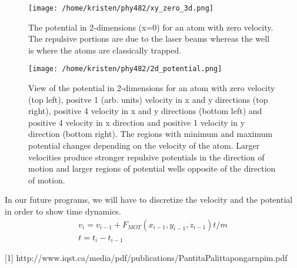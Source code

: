 \documentclass[10pt,showpacs,preprintnumbers,footinbib,amsmath,amssymb,aps,prl,groupedaddress,superscriptaddress,showkeys]{revtex4-1}
\begin{document}
\begin{figure}[ht!]\label{2dpot}
  \centering
  \texttt{[image: /home/kristen/phy482/xy\_zero\_3d.png]}
  \caption{The potential in 2-dimensions (x=0) for an atom with zero velocity. The repulsive portions are due to the laser beams whereas the well is where the atoms are classically trapped.}
\end{figure}
\begin{figure}[ht!]\label{2dpot_4}
  \centering
  \texttt{[image: /home/kristen/phy482/2d\_potential.png]}
  \caption{View of the potential in 2-dimensions for an atom with zero velocity (top left), positve 1 (arb. units) velocity in x and y directions (top right), positive 4 velocity in x and y directions (bottom left) and positive 4 velocity in x direction and positive 1 velocity in y direction (bottom right). The regions with minimum and maximum potential changes depending on the velocity of the atom. Larger velocities produce stronger repulsive potentials in the direction of motion and larger regions of potential wells opposite of the direction of motion.}
\end{figure}


In our future programs, we will have to discretize the velocity and the potential in order to show time dynamics.
\begin{equation}
\begin{multlined}
v_i = v_{i-1} + F_{MOT}(x_{i-1},y_{i-1},z_{i-1})t/m \\
t = t_{i}-t_{i-1}
\end{multlined}
\end{equation}


[1] http://www.iqst.ca/media/pdf/publications/PantitaPalittapongarnpim.pdf
\end{document}
